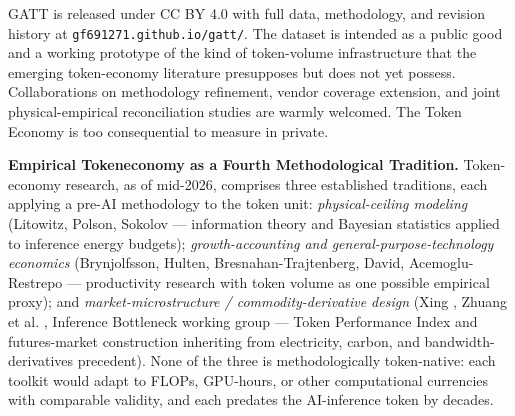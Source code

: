 \documentclass[11pt,a4paper]{article}
\begin{document}
GATT is released under CC BY 4.0 with full data, methodology, and revision history at \texttt{gf691271.github.io/gatt/}. The dataset is intended as a public good and a working prototype of the kind of token-volume infrastructure that the emerging token-economy literature \cite{litowitz2026photons, xing2026token, zhuang2025beyond} presupposes but does not yet possess. Collaborations on methodology refinement, vendor coverage extension, and joint physical-empirical reconciliation studies are warmly welcomed. The Token Economy is too consequential to measure in private.

\textbf{Empirical Tokeneconomy as a Fourth Methodological Tradition.} Token-economy research, as of mid-2026, comprises three established traditions, each applying a pre-AI methodology to the token unit: \emph{physical-ceiling modeling} (Litowitz, Polson, Sokolov \cite{litowitz2026photons} --- information theory and Bayesian statistics applied to inference energy budgets); \emph{growth-accounting and general-purpose-technology economics} (Brynjolfsson, Hulten, Bresnahan-Trajtenberg, David, Acemoglu-Restrepo --- productivity research with token volume as one possible empirical proxy); and \emph{market-microstructure / commodity-derivative design} (Xing \cite{xing2026token}, Zhuang et al. \cite{zhuang2025beyond}, Inference Bottleneck working group \cite{inference2026bottleneck} --- Token Performance Index and futures-market construction inheriting from electricity, carbon, and bandwidth-derivatives precedent). None of the three is methodologically token-native: each toolkit would adapt to FLOPs, GPU-hours, or other computational currencies with comparable validity, and each predates the AI-inference token by decades.
\end{document}
